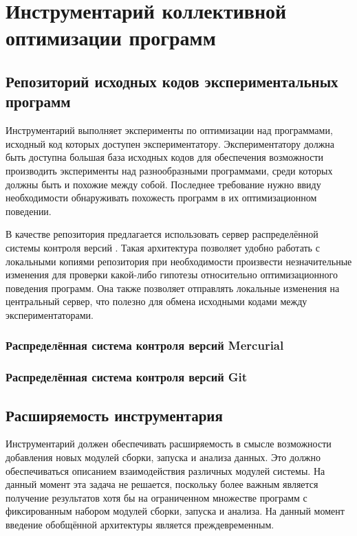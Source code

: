 \section{Инструментарий коллективной оптимизации программ}


\subsection{Репозиторий исходных кодов экспериментальных программ}
Инструментарий выполняет эксперименты по оптимизации над программами, исходный код которых доступен экспериментатору. Экспериментатору должна быть доступна большая база исходных кодов для обеспечения возможности производить эксперименты над разнообразными программами, среди которых должны быть и похожие между собой. Последнее требование нужно ввиду необходимости обнаруживать похожесть программ в их оптимизационном поведении.

В качестве репозитория предлагается использовать сервер распределённой системы контроля версий \cite{distributed-vcs}. Такая архитектура позволяет удобно работать с локальными копиями репозитория при необходимости произвести незначительные изменения для проверки какой-либо гипотезы относительно оптимизационного поведения программ. Она также позволяет отправлять локальные изменения на центральный сервер, что полезно для обмена исходными кодами между экспериментаторами.


\subsubsection{Распределённая система контроля версий Mercurial}



\subsubsection{Распределённая система контроля версий Git}



\subsection{Расширяемость инструментария}
Инструментарий должен обеспечивать расширяемость в смысле возможности добавления новых модулей сборки, запуска и анализа данных. Это должно обеспечиваться описанием взаимодействия различных модулей системы. На данный момент эта задача не решается, поскольку более важным является получение результатов хотя бы на ограниченном множестве программ с фиксированным набором модулей сборки, запуска и анализа. На данный момент введение обобщённой архитектуры является преждевременным.


